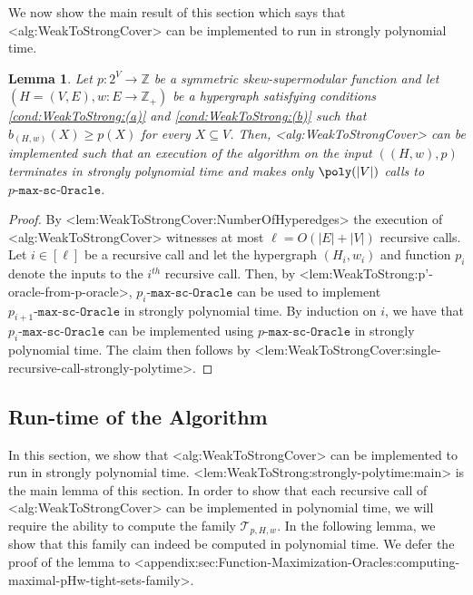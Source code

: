 \documentclass{article}
\def\Cref#1{<#1>}%
\newtheorem{lemma}{Lemma}[section]
\newcommand{\functionMaximizationOracleStrongCover}[1]{\ensuremath{{#1}\text{-}\mathtt{max}\text{-}\mathtt{sc}\text{-}\mathtt{Oracle}}\xspace}
\newcommand{\maximalTightSetFamily}[1]{\ensuremath{\calT_{#1}}\xspace}
\newcommand{\maximalTightSetContainingHyperedge}[1]{\ensuremath{\tau_{#1}}\xspace}
\providecommand{\Z}{\mathbb{Z}}
\providecommand{\calT}{\mathcal{T}}
\begin{document}
    We now show the main result of this section which says that \Cref{alg:WeakToStrongCover} can be implemented to run in strongly polynomial time.

\begin{lemma}\label{lem:WeakToStrongCover:strongly-polynomial-runtime:main}
    Let $p:2^V\rightarrow\Z$ be a symmetric skew-supermodular function and let $\left(H = (V, E), w:E \rightarrow\Z_+\right)$ be a hypergraph satisfying conditions \ref{cond:WeakToStrong:(a)} and \ref{cond:WeakToStrong:(b)} such that $b_{(H,w)}(X) \geq p(X)$ for every $X \subseteq V$. Then, \Cref{alg:WeakToStrongCover} can be implemented such that an execution of the algorithm on the input $((H,w), p)$ terminates in strongly polynomial time and makes only $\poly(|V|)$ calls to \functionMaximizationOracleStrongCover{p}.
\end{lemma}
\begin{proof}
 By \Cref{lem:WeakToStrongCover:NumberOfHyperedges} the execution of \Cref{alg:WeakToStrongCover} witnesses at most $\ell = O(|E| + |V|)$ recursive calls. Let $i \in [\ell]$ be a recursive call and let the hypergraph $(H_{i}, w_i)$ and function $p_i$ denote the inputs to the $i^{th}$ recursive call. Then, by \Cref{lem:WeakToStrong:p'-oracle-from-p-oracle}, \functionMaximizationOracleStrongCover{p_i} can be used to implement \functionMaximizationOracleStrongCover{p_{i+1}} in strongly polynomial time. By induction on $i$, we have that \functionMaximizationOracleStrongCover{p_i} can be implemented using \functionMaximizationOracleStrongCover{p} in strongly polynomial time. The claim then follows by \Cref{lem:WeakToStrongCover:single-recursive-call-strongly-polytime}.
\end{proof}
\fi


\subsection{Run-time of the Algorithm}
\label{sec:WeakToStrongCover:strongly-poly-runtime:main}
In this section, we show that \Cref{alg:WeakToStrongCover} can be implemented to run in strongly polynomial time. 
\Cref{lem:WeakToStrong:strongly-polytime:main} is the main lemma of this section. 
In order to show that each recursive call of \Cref{alg:WeakToStrongCover} can be implemented in polynomial time, we will require the ability to compute the family \maximalTightSetFamily{p, H, w}.  
In the following lemma, we show that this family can indeed be computed in polynomial time. We defer the proof of the lemma to \Cref{appendix:sec:Function-Maximization-Oracles:computing-maximal-pHw-tight-sets-family}.
\end{document}

